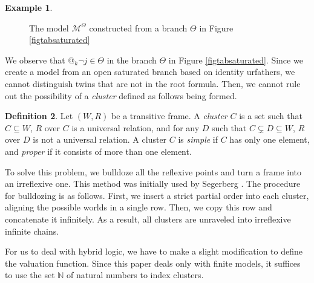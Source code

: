 \documentclass{article}
\theoremstyle{definition}
\newtheorem{definition}{Definition}[section]
\newtheorem{example}[definition]{Example}
\newcommand{\Kmodel}{\mathcal{M}}
\begin{document}
\begin{example}
    \begin{figure}[tbph]
        \centering
        \caption{The model $\Kmodel^\Theta$ constructed from a branch $\Theta$ in Figure \ref{figtabsaturated}}
        \label{figrefpoint}
    \end{figure}
\end{example}

We observe that $@_k \neg j \in \Theta$ in the branch $\Theta$ in Figure \ref{figtabsaturated}. Since we create a model from an open saturated branch based on identity urfathers, we cannot distinguish twins that are not in the root formula. Then, we cannot rule out the possibility of a \emph{cluster} defined as follows being formed.

\begin{definition}
    Let $(W, R)$ be a transitive frame. A \emph{cluster} $C$ is a set such that $C \subseteq W$, $R$ over $C$ is a universal relation, and for any $D$ such that $C \subsetneq D \subseteq W$, $R$ over $D$ is not a universal relation. A cluster $C$ is \emph{simple} if $C$ has only one element, and \emph{proper} if it consists of more than one element. 
\end{definition}

To solve this problem, we bulldoze all the reflexive points and turn a frame into an irreflexive one. This method was initially used by Segerberg \cite{segerberg1971}. The procedure for bulldozing is as follows. First, we insert a strict partial order into each cluster, aligning the possible worlds in a single row. Then, we copy this row and concatenate it infinitely. As a result, all clusters are unraveled into irreflexive infinite chains.

For us to deal with hybrid logic, we have to make a slight modification to define the valuation function. Since this paper deals only with finite models, it suffices to use the set $\mathbb{N}$ of natural numbers to index clusters.
\end{document}
